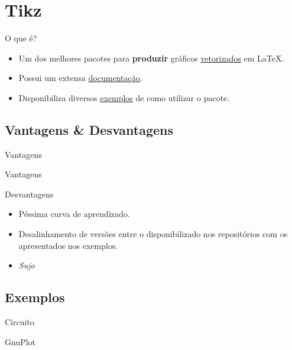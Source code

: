 
\section{Tikz} %
\label{sec:tikz}

\begin{frame}{O que é?}
\begin{block}{}
	\begin{itemize}
		\item Um dos melhores pacotes para {\bf produzir} gráficos \underline{vetorizados} em \LaTeX.
		\item Possui um extensa \href{http://ftp.fau.de/ctan/graphics/pgf/base/doc/pgfmanual.pdf}{documentação}.
		\item Disponibiliza diversos \href{http://www.texample.net/tikz/examples/}{exemplos} de como utilizar o pacote.
	\end{itemize}
\end{block}
\end{frame}

\subsection*{Vantagens \& Desvantagens}
\begin{frame}{Vantagens}
	\begin{multicols}{2}		
	
	
	\end{multicols}
\end{frame}

\begin{frame}{Vantagens}
	\begin{multicols}{2}		
	
	
	\end{multicols}
\end{frame}


\begin{frame}{Desvantagens}
	\begin{block}{}
		\begin{itemize}
			\item Péssima curva de aprendizado.
			\item Desalinhamento de  versões entre o disponibilizado nos repositórios com os apresentados nos exemplos.
			\item {\it Sujo}
		\end{itemize}
	\end{block}
\end{frame}

\subsection*{Exemplos}
\begin{frame}{Circuito}
	
\end{frame}

\begin{frame}{GnuPlot}
	
\end{frame}